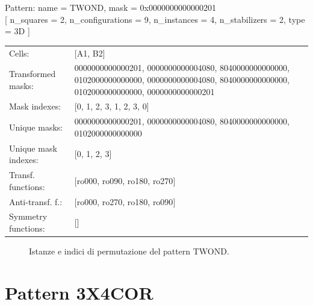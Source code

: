 \begin{tcolorbox}[sharp corners, fontupper=\ttfamily\small, colback=white]
  \noindent Pattern: name = TWOND, mask = 0x0000000000000201\\
  {[} n\_squares = 2, n\_configurations = 9,
  n\_instances = 4, n\_stabilizers = 2, type = 3D { ]}\\[1.0ex]
  \begin{tabularx}{\textwidth}{@{} p{3.5cm} X @{}}
    Cells:               & {[}A1, B2{]}\\[0.5ex]
    Transformed masks:   & 0000000000000201, 0000000000004080, 8040000000000000, 0102000000000000, 0000000000004080, 8040000000000000, 0102000000000000, 0000000000000201\\[0.5ex]
    Mask indexes:        & {[}0, 1, 2, 3, 1, 2, 3, 0{]}\\[0.5ex]
    Unique masks:        & 0000000000000201, 0000000000004080, 8040000000000000, 0102000000000000\\[0.5ex]
    Unique mask indexes: & {[}0, 1, 2, 3{]}\\[0.5ex]
    Transf. functions:   & {[}ro000, ro090, ro180, ro270{]}\\[0.5ex]
    Anti-transf. f.:     & {[}ro000, ro270, ro180, ro090{]}\\[0.5ex]
    Symmetry functions:  & {[}{]}\\[0.5ex]
  \end{tabularx}
\end{tcolorbox}

\begin{figure}[htbp]
  \centering
   \hfill
   \hfill
   \hfill
  \vspace{0.3cm}
   \hfill
   \hfill
   \hfill
  \caption{Istanze e indici di permutazione del pattern TWOND.}
\end{figure}

\newpage

\section{Pattern 3X4COR}

